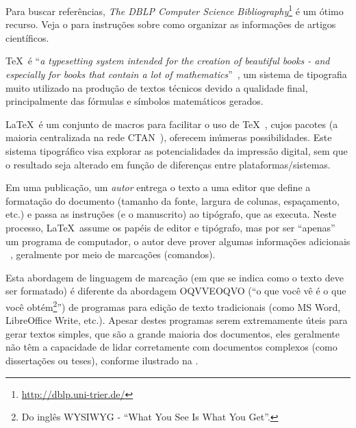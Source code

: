 Para buscar referências, \emph{The DBLP Computer Science Bibliography}\footnote{\url{http://dblp.uni-trier.de/}}
é um ótimo recurso. Veja o  para instruções
sobre como organizar as informações de artigos científicos.



\TeX\ é ``\emph{a typesetting system intended for the creation of beautiful books
 - and especially for books that contain a lot of mathematics}''~\cite{Knuth_1986_texbook},
 um sistema de tipografia muito utilizado na produção de textos técnicos devido
 a qualidade final, principalmente das fórmulas e símbolos matemáticos gerados.

\LaTeX\ é um conjunto de macros para facilitar o uso de \TeX~\cite{lamport_latex:_1994},
cujos pacotes (a maioria centralizada na rede {CTAN}~\cite{greenwade93}), oferecem
inúmeras possibilidades. Este sistema tipográfico visa explorar as potencialidades
da impressão digital, sem que o resultado seja alterado em função de diferenças
entre plataformas/sistemas.

Em uma publicação, um \emph{autor} entrega o texto a uma editor que define a
formatação do documento (tamanho da fonte, largura de colunas, espaçamento, etc.)
e passa as instruções (e o manuscrito) ao tipógrafo, que as executa. Neste processo,
\LaTeX\ assume os papéis de editor e tipógrafo, mas por ser ``apenas'' um programa
de computador, o autor deve prover algumas informações adicionais ~\cite{Oetiker_1995_notsoshort},
geralmente por meio de marcações (comandos).

Esta abordagem de linguagem de marcação (em que se indica como o texto deve ser
formatado) é diferente da abordagem OQVVEOQVO (``o que você vê é o que você
obtém\footnote{Do inglês WYSIWYG - ``What You See Is What You Get''.}'') de programas
para edição de texto tradicionais (como MS Word, LibreOffice Write, etc.).
Apesar destes programas serem extremamente úteis para gerar textos simples, que
são a grande maioria dos documentos, eles geralmente não têm a capacidade de lidar
corretamente com documentos complexos (como dissertações ou teses), conforme ilustrado
na .%

